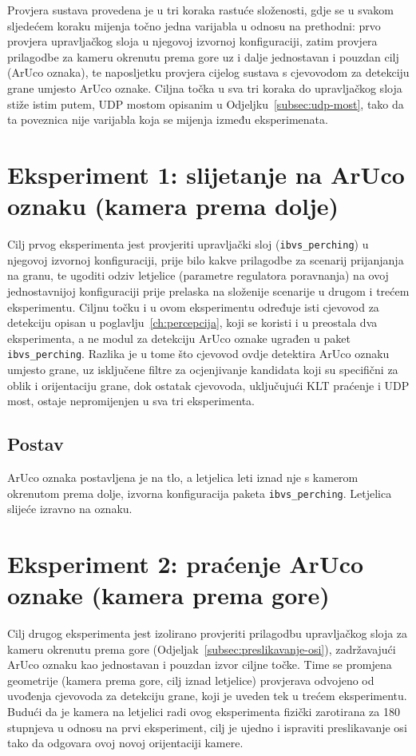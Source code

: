 Provjera sustava provedena je u tri koraka rastuće složenosti, gdje se u svakom sljedećem koraku mijenja točno jedna varijabla u odnosu na prethodni: prvo provjera upravljačkog sloja u njegovoj izvornoj konfiguraciji, zatim provjera prilagodbe za kameru okrenutu prema gore uz i dalje jednostavan i pouzdan cilj (ArUco oznaka), te naposljetku provjera cijelog sustava s cjevovodom za detekciju grane umjesto ArUco oznake. Ciljna točka u sva tri koraka do upravljačkog sloja stiže istim putem, UDP mostom opisanim u Odjeljku~\ref{subsec:udp-most}, tako da ta poveznica nije varijabla koja se mijenja između eksperimenata.

\section{Eksperiment 1: slijetanje na ArUco oznaku (kamera prema dolje)}
\label{sec:test1}

Cilj prvog eksperimenta jest provjeriti upravljački sloj (\texttt{ibvs\_perching}) u njegovoj izvornoj konfiguraciji, prije bilo kakve prilagodbe za scenarij prijanjanja na granu, te ugoditi odziv letjelice (parametre regulatora poravnanja) na ovoj jednostavnijoj konfiguraciji prije prelaska na složenije scenarije u drugom i trećem eksperimentu. Ciljnu točku i u ovom eksperimentu određuje isti cjevovod za detekciju opisan u poglavlju~\ref{ch:percepcija}, koji se koristi i u preostala dva eksperimenta, a ne modul za detekciju ArUco oznake ugrađen u paket \texttt{ibvs\_perching}. Razlika je u tome što cjevovod ovdje detektira ArUco oznaku umjesto grane, uz isključene filtre za ocjenjivanje kandidata koji su specifični za oblik i orijentaciju grane, dok ostatak cjevovoda, uključujući KLT praćenje i UDP most, ostaje nepromijenjen u sva tri eksperimenta.

\subsection{Postav}
\label{subsec:test1-postav}
ArUco oznaka postavljena je na tlo, a letjelica leti iznad nje s kamerom okrenutom prema dolje, izvorna konfiguracija paketa \texttt{ibvs\_perching}. Letjelica slijeće izravno na oznaku.

\section{Eksperiment 2: praćenje ArUco oznake (kamera prema gore)}
\label{sec:test2}

Cilj drugog eksperimenta jest izolirano provjeriti prilagodbu upravljačkog sloja za kameru okrenutu prema gore (Odjeljak~\ref{subsec:preslikavanje-osi}), zadržavajući ArUco oznaku kao jednostavan i pouzdan izvor ciljne točke. Time se promjena geometrije (kamera prema gore, cilj iznad letjelice) provjerava odvojeno od uvođenja cjevovoda za detekciju grane, koji je uveden tek u trećem eksperimentu. Budući da je kamera na letjelici radi ovog eksperimenta fizički zarotirana za 180 stupnjeva u odnosu na prvi eksperiment, cilj je ujedno i ispraviti preslikavanje osi tako da odgovara ovoj novoj orijentaciji kamere.

